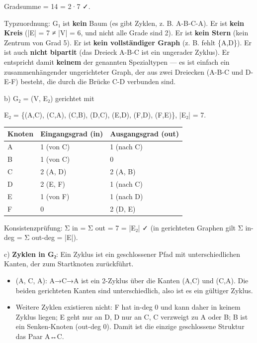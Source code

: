 \documentclass[11pt, a4paper]{article}
\begin{document}
Gradsumme = 14 = 2·7 ✓.


Typzuordnung: G₁ ist \textbf{kein} Baum (es gibt Zyklen, z. B. A-B-C-A). Er ist \textbf{kein Kreis} (|E| = 7 ≠ |V| = 6, und nicht alle Grade sind 2). Er ist \textbf{kein Stern} (kein Zentrum von Grad 5). Er ist \textbf{kein vollständiger Graph} (z. B. fehlt \{A,D\}). Er ist auch \textbf{nicht bipartit} (das Dreieck A-B-C ist ein ungerader Zyklus). Er entspricht damit \textbf{keinem} der genannten Spezialtypen — es ist einfach ein zusammenhängender ungerichteter Graph, der aus zwei Dreiecken (A-B-C und D-E-F) besteht, die durch die Brücke C-D verbunden sind.


b) G₂ = (V, E₂) gerichtet mit

E₂ = \{(A,C), (C,A), (C,B), (D,C), (E,D), (F,D), (F,E)\}, |E₂| = 7.



{\small
\begin{tabularx}{\linewidth}{XXX}
\hline
\rowcolor{tableheadbg}
{\color{white}\textbf{Knoten}} & {\color{white}\textbf{Eingangsgrad (in)}} & {\color{white}\textbf{Ausgangsgrad (out)}} \\[2pt]
\hline
\endhead
\hline
\endfoot
A & 1 (von C) & 1 (nach C) \\
B & 1 (von C) & 0 \\
C & 2 (A, D) & 2 (A, B) \\
D & 2 (E, F) & 1 (nach C) \\
E & 1 (von F) & 1 (nach D) \\
F & 0 & 2 (D, E) \\
\end{tabularx}
}


Konsistenzprüfung: Σ in = Σ out = 7 = |E₂| ✓ (in gerichteten Graphen gilt Σ in-deg = Σ out-deg = |E|).


c) \textbf{Zyklen in G₂}: Ein Zyklus ist ein geschlossener Pfad mit unterschiedlichen Kanten, der zum Startknoten zurückführt.


\begin{itemize}
  \item (A, C, A): A→C→A ist ein 2-Zyklus über die Kanten (A,C) und (C,A). Die beiden gerichteten Kanten sind unterschiedlich, also ist es ein gültiger Zyklus.
  \item Weitere Zyklen existieren nicht: F hat in-deg 0 und kann daher in keinem Zyklus liegen; E geht nur an D, D nur an C, C verzweigt zu A oder B; B ist ein Senken-Knoten (out-deg 0). Damit ist die einzige geschlossene Struktur das Paar A↔C.
\end{itemize}
\end{document}

